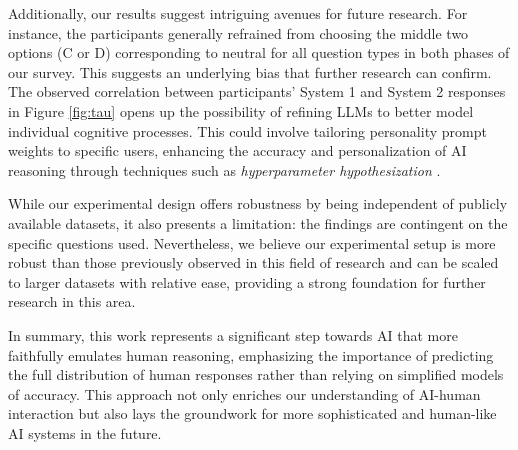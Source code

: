     Additionally, our results suggest intriguing avenues for future research. For instance, the participants generally refrained from choosing the middle two options (C or D) corresponding to neutral for all question types in both phases of our survey. This suggests an underlying bias that further research can confirm. The observed correlation between participants' System 1 and System 2 responses in Figure \ref{fig:tau} opens up the possibility of refining LLMs to better model individual cognitive processes. This could involve tailoring personality prompt weights to specific users, enhancing the accuracy and personalization of AI reasoning through techniques such as \textit{hyperparameter hypothesization} \citep{nighojkar_cognitive_2022, nighojkar_inference-centric_2024}.

    While our experimental design offers robustness by being independent of publicly available datasets, it also presents a limitation: the findings are contingent on the specific questions used. Nevertheless, we believe our experimental setup is more robust than those previously observed in this field of research \citep{hagendorff_human-like_2023} and can be scaled to larger datasets with relative ease, providing a strong foundation for further research in this area.

    In summary, this work represents a significant step towards AI that more faithfully emulates human reasoning, emphasizing the importance of predicting the full distribution of human responses rather than relying on simplified models of accuracy. This approach not only enriches our understanding of AI-human interaction but also lays the groundwork for more sophisticated and human-like AI systems in the future.